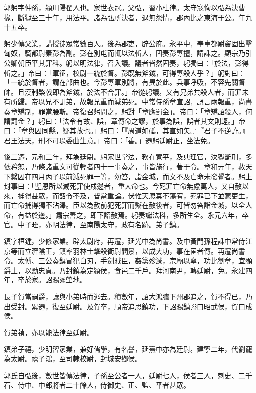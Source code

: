 
\begin{pinyinscope}
郭躬字仲孫，潁川陽翟人也。家世衣冠。父弘，習小杜律。太守寇恂以弘為決曹掾，斷獄至三十年，用法平。諸為弘所決者，退無怨情，郡內比之東海于公。年九十五卒。

躬少傳父業，講授徒眾常數百人。後為郡吏，辟公府。永平中，奉車都尉竇固出擊匈奴，騎都尉秦彭為副。彭在別屯而輒以法斬人，固奏彭專擅，請誅之。顯宗乃引公卿朝臣平其罪科。躬以明法律，召入議。議者皆然固奏，躬獨曰：「於法，彭得斬之。」帝曰：「軍征，校尉一統於督。彭既無斧鉞，可得專殺人乎？」躬對曰：「一統於督者，謂在部曲也。今彭專軍別將，有異於此。兵事呼吸，不容先關督帥。且漢制棨戟即為斧鉞，於法不合罪。」帝從躬議。又有兄弟共殺人者，而罪未有所歸。帝以兄不訓弟，故報兄重而減弟死。中常侍孫章宣詔，誤言兩報重，尚書奏章矯制，罪當腰斬。帝復召躬問之，躬對「章應罰金」。帝曰：「章矯詔殺人，何謂罰金？」躬曰：「法令有故、誤，章傳命之謬，於事為誤，誤者其文則輕。」帝曰：「章與囚同縣，疑其故也。」躬曰：「『周道如砥，其直如矢。』『君子不逆詐。』君王法天，刑不可以委曲生意。」帝曰：「善。」遷躬廷尉正，坐法免。

後三遷，元和三年，拜為廷尉。躬家世掌法，務在寬平，及典理官，決獄斷刑，多依矜恕，乃條諸重文可從輕者四十一事奏之，事皆施行，著于令。章和元年，赦天下繫囚在四月丙子以前減死罪一等，勿笞，詣金城，而文不及亡命未發覺者。躬上封事曰：「聖恩所以減死罪使戍邊者，重人命也。今死罪亡命無慮萬人，又自赦以來，捕得甚眾，而詔令不及，皆當重論。伏惟天恩莫不蕩宥，死罪已下並蒙更生，而亡命捕得獨不沾澤。臣以為赦前犯死罪而繫在赦後者，可皆勿笞詣金城，以全人命，有益於邊。」肅宗善之，即下詔赦焉。躬奏讞法科，多所生全。永元六年，卒官。中子晊，亦明法律，至南陽太守，政有名跡。弟子鎮。

鎮字桓鍾，少修家業。辟太尉府，再遷，延光中為尚書。及中黃門孫程誅中常侍江京等而立濟陰王，鎮率羽林士擊殺衛尉閻景，以成大功，事在宦者傳。再遷尚書令。太傅、三公奏鎮冒犯白刃，手劍賊臣，姦黨殄滅，宗廟以寧，功比劉章，宜顯爵土，以勵忠貞。乃封鎮為定潁侯，食邑二千戶。拜河南尹，轉廷尉，免。永建四年，卒於家。詔賜冢塋地。

長子賀當嗣爵，讓與小弟時而逃去。積數年，詔大鴻臚下州郡追之，賀不得已，乃出受封。累遷，復至廷尉。及賀卒，順帝追思鎮功，下詔賜鎮謚曰昭武侯，賀曰成侯。

賀弟禎，亦以能法律至廷尉。

鎮弟子禧，少明習家業，兼好儒學，有名譽，延熹中亦為廷尉。建寧二年，代劉寵為太尉。禧子鴻，至司隸校尉，封城安鄉侯。

郭氏自弘後，數世皆傳法律，子孫至公者一人，廷尉七人，侯者三人，刺史、二千石、侍中、中郎將者二十餘人，侍御史、正、監、平者甚眾。


\end{pinyinscope}

